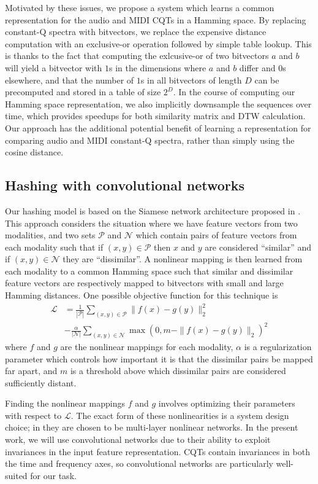 \documentclass{article}
\begin{document}
Motivated by these issues, we propose a system which learns a common representation for the audio and MIDI CQTs in a Hamming space.
By replacing constant-Q spectra with bitvectors, we replace the expensive distance computation with an exclusive-or operation followed by simple table lookup.
This is thanks to the fact that computing the exlcusive-or of two bitvectors $a$ and $b$ will yield a bitvector with $1$s in the dimensions where $a$ and $b$ differ and $0$s elsewhere, and that the number of $1$s in all bitvectors of length $D$ can be precomputed and stored in a table of size $2^D$.
In the course of computing our Hamming space representation, we also implicitly downsample the sequences over time, which provides speedups for both similarity matrix and DTW calculation.
Our approach has the additional potential benefit of learning a representation for comparing audio and MIDI constant-Q spectra, rather than simply using the cosine distance.

\subsection{Hashing with convolutional networks}

Our hashing model is based on the Siamese network architecture proposed in \cite{masci2014multimodal}.
This approach considers the situation where we have feature vectors from two modalities, and two sets $\mathcal{P}$ and $\mathcal{N}$ which contain pairs of feature vectors from each modality such that if $(x, y) \in \mathcal{P}$ then $x$ and $y$ are considered ``similar'' and if $(x, y) \in \mathcal{N}$ they are ``dissimilar''.
A nonlinear mapping is then learned from each modality to a common Hamming space such that similar and dissimilar feature vectors are respectively mapped to bitvectors with small and large Hamming distances.
One possible objective function for this technique is
\begin{align*}
\mathcal{L} &= \frac{1}{|\mathcal{P}|} \sum_{(x, y) \in \mathcal{P}} \| f(x) - g(y) \|_2^2\\
& - \frac{\alpha}{|\mathcal{N}|} \sum_{(x, y) \in \mathcal{N}} \max(0, m - \|f(x) - g(y) \|_2)^2
\end{align*}
where $f$ and $g$ are the nonlinear mappings for each modality, $\alpha$ is a regularization parameter which controls how important it is that the dissimilar pairs be mapped far apart, and $m$ is a threshold above which dissimilar pairs are considered sufficiently distant.

Finding the nonlinear mappings $f$ and $g$ involves optimizing their parameters with respect to $\mathcal{L}$.
The exact form of these nonlinearities is a system design choice; in \cite{masci2014multimodal} they are chosen to be multi-layer nonlinear networks.
In the present work, we will use convolutional networks due to their ability to exploit invariances in the input feature representation.
CQTs contain invariances in both the time and frequency axes, so convolutional networks are particularly well-suited for our task.
\end{document}
